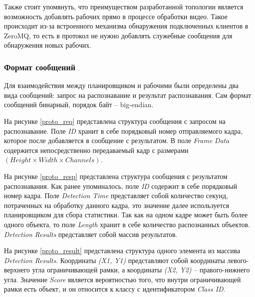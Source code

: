 Также стоит упомянуть, что преимуществом разработанной топологии является возможность добавлять рабочих прямо в процессе 
обработки видео. Такое происходит из-за встроенного механизма обнаружения подключенных клиентов в ZeroMQ, то есть в 
протокол не нужно добавлять служебные сообщения для обнаружения новых рабочих. 

\subsubsection{Формат сообщений}

Для взаимодействия между планировщиком и рабочими были определены два вида сообщений: запрос на распознавание и результат
распознавания. Сам формат сообщений бинарный, порядок байт -- big-endian.

На рисунке \ref{proto_req} представлена структура сообщения с запросом на распознавание. Поле \emph{ID} хранит в себе
порядковый номер отправляемого кадра, которое после добавляется в сообщение с результатом. В поле \emph{Frame Data} 
содержится непосредственно передаваемый кадр с размерами $(Height \times Width \times Channels)$.


На рисунке \ref{proto_resp} представлена структура сообщения с результатом распознавания. Как ранее упоминалось, 
поле \emph{ID} содержит в себе порядковый номер кадра. Поле \emph{Detection Time} представляет собой количество секунд,
потраченных на обработку данного кадра, это значение далее используется планировщиком для сбора статистики. Так как
на одном кадре может быть более одного объекта, то поле \emph{Length} хранит в себе количество распознанных объектов.
\emph{Detection Results} представляет собой массив результатов.


На рисунке \ref{proto_result} представлена структура одного элемента из массива \emph{Detection Results}. Координаты
\emph{(X1, Y1)} представляют собой координаты левого-верхнего угла ограничивающей рамки, а координаты \emph{(X2, Y2)} -- 
правого-нижнего угла. Значение \emph{Score} является вероятностью того, что внутри ограничивающей рамки есть объект, 
и он относится к классу с идентификатором \emph{Class ID}.


